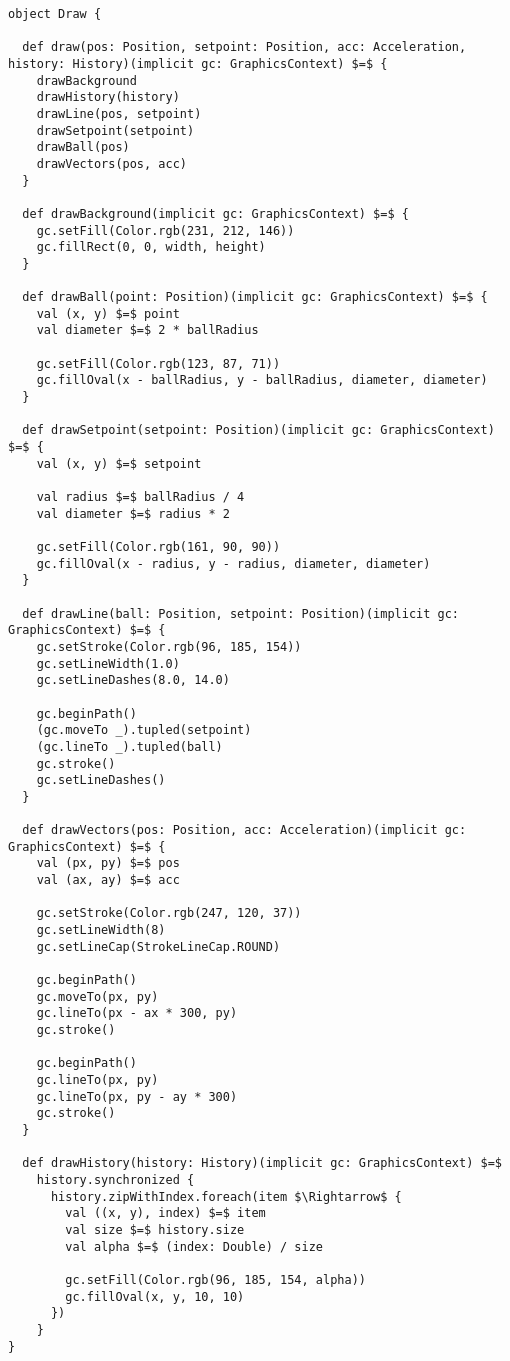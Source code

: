 \begin{lstlisting}[style=ScalaStyle, caption={Ball movement \code{Draw} object}, label={lst:ball-full-draw}]
object Draw {

  def draw(pos: Position, setpoint: Position, acc: Acceleration, history: History)(implicit gc: GraphicsContext) $=$ {
    drawBackground
    drawHistory(history)
    drawLine(pos, setpoint)
    drawSetpoint(setpoint)
    drawBall(pos)
    drawVectors(pos, acc)
  }

  def drawBackground(implicit gc: GraphicsContext) $=$ {
    gc.setFill(Color.rgb(231, 212, 146))
    gc.fillRect(0, 0, width, height)
  }

  def drawBall(point: Position)(implicit gc: GraphicsContext) $=$ {
    val (x, y) $=$ point
    val diameter $=$ 2 * ballRadius

    gc.setFill(Color.rgb(123, 87, 71))
    gc.fillOval(x - ballRadius, y - ballRadius, diameter, diameter)
  }

  def drawSetpoint(setpoint: Position)(implicit gc: GraphicsContext) $=$ {
    val (x, y) $=$ setpoint

    val radius $=$ ballRadius / 4
    val diameter $=$ radius * 2

    gc.setFill(Color.rgb(161, 90, 90))
    gc.fillOval(x - radius, y - radius, diameter, diameter)
  }

  def drawLine(ball: Position, setpoint: Position)(implicit gc: GraphicsContext) $=$ {
    gc.setStroke(Color.rgb(96, 185, 154))
    gc.setLineWidth(1.0)
    gc.setLineDashes(8.0, 14.0)

    gc.beginPath()
    (gc.moveTo _).tupled(setpoint)
    (gc.lineTo _).tupled(ball)
    gc.stroke()
    gc.setLineDashes()
  }

  def drawVectors(pos: Position, acc: Acceleration)(implicit gc: GraphicsContext) $=$ {
    val (px, py) $=$ pos
    val (ax, ay) $=$ acc

    gc.setStroke(Color.rgb(247, 120, 37))
    gc.setLineWidth(8)
    gc.setLineCap(StrokeLineCap.ROUND)

    gc.beginPath()
    gc.moveTo(px, py)
    gc.lineTo(px - ax * 300, py)
    gc.stroke()

    gc.beginPath()
    gc.lineTo(px, py)
    gc.lineTo(px, py - ay * 300)
    gc.stroke()
  }

  def drawHistory(history: History)(implicit gc: GraphicsContext) $=$
    history.synchronized {
      history.zipWithIndex.foreach(item $\Rightarrow$ {
        val ((x, y), index) $=$ item
        val size $=$ history.size
        val alpha $=$ (index: Double) / size

        gc.setFill(Color.rgb(96, 185, 154, alpha))
        gc.fillOval(x, y, 10, 10)
      })
    }
}
\end{lstlisting}

